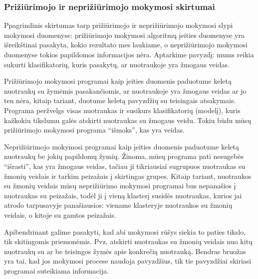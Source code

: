 \subsubsection{Prižiūrimojo ir neprižiūrimojo mokymosi skirtumai}
Ppagrindinis skirtumas tarp prižiūrimojo ir neprižiūrimojo mokymosi slypi
mokymosi duomenyse: prižiūrimojo mokymosi algoritmų įeities duomenyse yra
išreikštinai pasakyta, kokio rezultato mes laukiame, o neprižiūrimojo mokymosi duomenyse tokios
papildomos informacijos nėra. Aptarkime pavyzdį: mums reikia sukurti
klasifikatorių, kuris pasakytų, ar nuotraukoje yra žmogaus veidas. 

Prižiūrimojo mokymosi programai kaip įeities duomenis paduotume keletą 
nuotraukų su žymėmis pasakančiomis, ar nuotraukoje yra žmogaus veidas ar jo ten
nėra, kitaip tariant, duotume keletą pavyzdžių su teisingais atsakymais.
Programa peržvelgs visas nuotraukas ir susikurs klasifikatorių (modelį), kuris
kažkokiu tikslumu galės atskirti nuotraukas su žmogaus veidu. Tokiu būdu mūsų
prižiūrimojo mokymosi programa ``išmoks'', kas yra veidas.

Neprižiūrimojo mokymosi programai kaip įeities duomenis paduotume keletą
nuotraukų be jokių papildomų žymių. Žinoma, mūsų programa pati nesugebės
``išrasti'', kas yra žmogaus veidas, tačiau ji tikriausiai sugrupuos nuotraukas
su žmonių veidais ir tarkim peizažais į skirtingas grupes. Kitaip tariant,
nuotraukos su žmonių veidais mūsų neprižiūrimo mokymosi programai bus nepanašios
į nuotraukas su peizažais, todėl ji į vieną klasterį susidės nuotraukas, kurios
jai atrodo tarpusavyje panašiausios: viename klasteryje nuotraukos su žmonių
veidais, o kitoje su gamtos peizažais.

Apibendrinant galime pasakyti, kad abi mokymosi rūšys siekia to paties tikslo,
tik skitingomis priemonėmis. Pvz. atskirti nuotraukas su žmonių
veidais nuo kitų nuotraukų su ar be teisingos žymės apie konkrečią nuotrauką.
Bendras bruožas yra tai, kad jos mokymosi procese naudoja pavyzdžius, tik tie pavyzdžiai 
skiriasi programai suteikiama informacija. %



